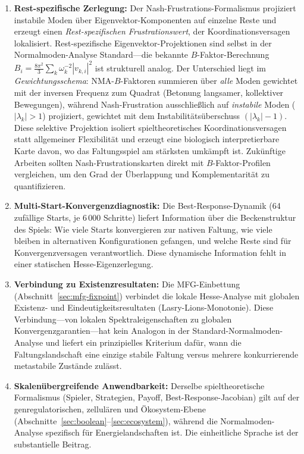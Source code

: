 \documentclass[12pt,a4paper]{article}
\theoremstyle{remark}
\begin{document}
\begin{enumerate}
    \item \textbf{Rest-spezifische Zerlegung:} Der Nash-Frustrations-Formalismus projiziert instabile Moden \"uber Eigenvektor-Komponenten auf einzelne Reste und erzeugt einen \emph{Rest-spezifischen Frustrationswert}, der Koordinationsversagen lokalisiert. Rest-spezifische Eigenvektor-Projektionen sind selbst in der Normalmoden-Analyse Standard---die bekannte $B$-Faktor-Berechnung $B_i = \frac{8\pi^2}{3}\sum_k \omega_k^{-2}|v_{k,i}|^2$ ist strukturell analog. Der Unterschied liegt im \emph{Gewichtungsschema}: NMA-$B$-Faktoren summieren \"uber \emph{alle} Moden gewichtet mit der inversen Frequenz zum Quadrat (Betonung langsamer, kollektiver Bewegungen), w\"ahrend Nash-Frustration ausschlie\ss{}lich auf \emph{instabile} Moden ($|\lambda_k|>1$) projiziert, gewichtet mit dem Instabilit\"ats\"uberschuss $(|\lambda_k|-1)$. Diese selektive Projektion isoliert spieltheoretisches Koordinationsversagen statt allgemeiner Flexibilit\"at und erzeugt eine biologisch interpretierbare Karte davon, wo das Faltungsspiel am st\"arksten umk\"ampft ist. Zuk\"unftige Arbeiten sollten Nash-Frustrationskarten direkt mit $B$-Faktor-Profilen vergleichen, um den Grad der \"Uberlappung und Komplementarit\"at zu quantifizieren.
    \item \textbf{Multi-Start-Konvergenzdiagnostik:} Die Best-Response-Dynamik (64 zuf\"allige Starts, je 6\,000 Schritte) liefert Information \"uber die Beckenstruktur des Spiels: Wie viele Starts konvergieren zur nativen Faltung, wie viele bleiben in alternativen Konfigurationen gefangen, und welche Reste sind f\"ur Konvergenzversagen verantwortlich. Diese dynamische Information fehlt in einer statischen Hesse-Eigenzerlegung.
    \item \textbf{Verbindung zu Existenzresultaten:} Die MFG-Einbettung (Abschnitt~\ref{sec:mfg-fixpoint}) verbindet die lokale Hesse-Analyse mit globalen Existenz- und Eindeutigkeitsresultaten (Lasry-Lions-Monotonie). Diese Verbindung---von lokalen Spektraleigenschaften zu globalen Konvergenzgarantien---hat kein Analogon in der Standard-Normalmoden-Analyse und liefert ein prinzipielles Kriterium daf\"ur, wann die Faltungslandschaft eine einzige stabile Faltung versus mehrere konkurrierende metastabile Zust\"ande zul\"asst.
    \item \textbf{Skalen\"ubergreifende Anwendbarkeit:} Derselbe spieltheoretische Formalismus (Spieler, Strategien, Payoff, Best-Response-Jacobian) gilt auf der genregulatorischen, zellul\"aren und \"Okosystem-Ebene (Abschnitte~\ref{sec:boolean}--\ref{sec:ecosystem}), w\"ahrend die Normalmoden-Analyse spezifisch f\"ur Energielandschaften ist. Die einheitliche Sprache ist der substantielle Beitrag.
\end{enumerate}
\end{document}
